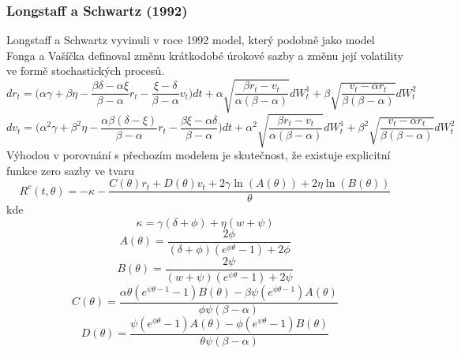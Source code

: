 \documentclass[a4paper]{book}
\begin{document}
\subsubsection{Longstaff a Schwartz (1992)}

Longstaff a Schwartz vyvinuli v roce 1992 model, který podobně jako model Fonga a Vašíčka definoval změnu krátkodobé úrokové sazby a změnu její volatility ve formě stochastických procesů.
\begin{equation*}
d r_t = \Big( \alpha \gamma + \beta \eta - \frac{\beta \delta - \alpha \xi}{\beta - \alpha} r_t - \frac{\xi - \delta}{\beta - \alpha}v_t \Big)dt + \alpha \sqrt{\frac{\beta r_t - v_t}{\alpha(\beta - \alpha)}}dW^1_t + \beta \sqrt{\frac{v_t - \alpha r_t}{\beta(\beta - \alpha)}}dW^2_t
\end{equation*}
\begin{equation*}
d v_t = \Big( \alpha^2 \gamma + \beta^2 \eta - \frac{\alpha \beta (\delta - \xi)}{\beta - \alpha} r_t - \frac{\beta \xi - \alpha \delta}{\beta - \alpha} \Big)dt + \alpha^2 \sqrt{\frac{\beta r_t - v_t}{\alpha(\beta - \alpha)}}dW^1_t + \beta^2 \sqrt{\frac{v_t - \alpha r_t}{\beta(\beta - \alpha)}}d W^2_t
\end{equation*}
Výhodou v porovnání s přechozím modelem je skutečnost, že existuje explicitní funkce zero sazby ve tvaru
\begin{equation*}
R^c(t, \theta) = - \kappa - \frac{C(\theta)r_t + D(\theta)v_t + 2 \gamma \ln(A(\theta)) + 2 \eta \ln(B(\theta))}{\theta}
\end{equation*}
kde
\begin{equation*}
\kappa = \gamma(\delta + \phi) + \eta(w + \psi)
\end{equation*}
\begin{equation*}
A(\theta) = \frac{2 \phi}{(\delta + \phi)(e^{\phi \theta} - 1) + 2 \phi}
\end{equation*}
\begin{equation*}
B(\theta) = \frac{2 \psi}{(w + \psi)(e^{\psi \theta} - 1) + 2 \psi}
\end{equation*}
\begin{equation*}
C(\theta) = \frac{\alpha \theta (e^{\psi \theta - 1} - 1)B(\theta) - \beta \psi (e^{\phi \theta - 1})A(\theta)}{\phi \psi (\beta - \alpha)}
\end{equation*}
\begin{equation*}
D(\theta) = \frac{\psi (e^{\phi \theta} - 1)A(\theta) - \phi (e^{\psi \theta} - 1)B(\theta)}{\theta \psi (\beta - \alpha)}
\end{equation*}
\end{document}
